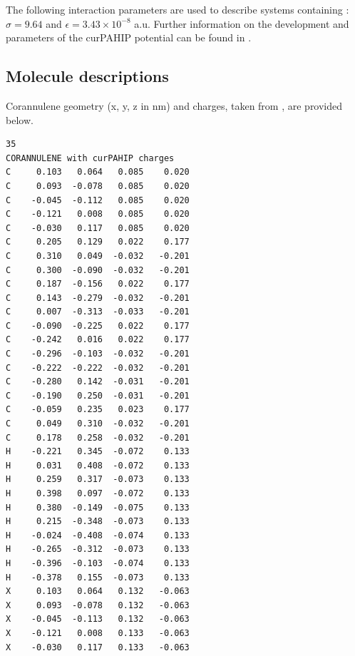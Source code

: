 The following interaction parameters are used to describe systems containing : $\sigma = 9.64$ and $\epsilon = 3.43\times10^{-8}$ a.u. Further information on the development and parameters of the curPAHIP potential can be found in \citet{bowal2019ion}.


\subsection{Molecule descriptions}
\label{sec:SImoleculedesc}
Corannulene geometry (x, y, z in nm) and charges, taken from \citet{bowal2019ion}, are provided below.
%
\begin{verbatim}
35 
CORANNULENE with curPAHIP charges
C     0.103   0.064   0.085    0.020  
C     0.093  -0.078   0.085    0.020  
C    -0.045  -0.112   0.085    0.020  
C    -0.121   0.008   0.085    0.020  
C    -0.030   0.117   0.085    0.020  
C     0.205   0.129   0.022    0.177  
C     0.310   0.049  -0.032   -0.201 
C     0.300  -0.090  -0.032   -0.201 
C     0.187  -0.156   0.022    0.177  
C     0.143  -0.279  -0.032   -0.201 
C     0.007  -0.313  -0.033   -0.201 
C    -0.090  -0.225   0.022    0.177  
C    -0.242   0.016   0.022    0.177  
C    -0.296  -0.103  -0.032   -0.201 
C    -0.222  -0.222  -0.032   -0.201 
C    -0.280   0.142  -0.031   -0.201 
C    -0.190   0.250  -0.031   -0.201 
C    -0.059   0.235   0.023    0.177  
C     0.049   0.310  -0.032   -0.201 
C     0.178   0.258  -0.032   -0.201 
H    -0.221   0.345  -0.072    0.133  
H     0.031   0.408  -0.072    0.133  
H     0.259   0.317  -0.073    0.133  
H     0.398   0.097  -0.072    0.133  
H     0.380  -0.149  -0.075    0.133  
H     0.215  -0.348  -0.073    0.133  
H    -0.024  -0.408  -0.074    0.133  
H    -0.265  -0.312  -0.073    0.133  
H    -0.396  -0.103  -0.074    0.133  
H    -0.378   0.155  -0.073    0.133  
X     0.103   0.064   0.132   -0.063 
X     0.093  -0.078   0.132   -0.063 
X    -0.045  -0.113   0.132   -0.063 
X    -0.121   0.008   0.133   -0.063 
X    -0.030   0.117   0.133   -0.063
\end{verbatim}

